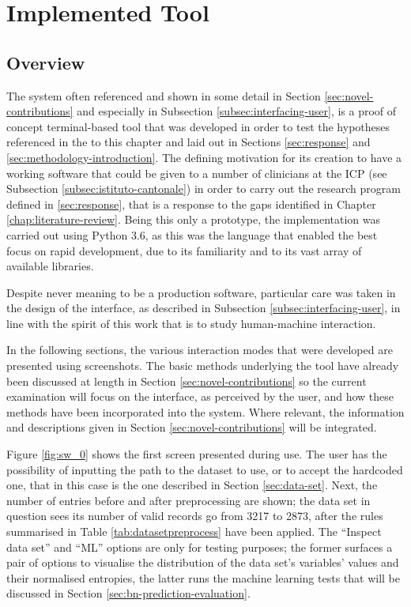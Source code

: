 \section{Implemented Tool} \label{sec:implemented-tool}
\subsection{Overview}
The system often referenced and shown in some detail in Section \ref{sec:novel-contributions} and especially in Subsection \ref{subsec:interfacing-user}, is a proof of concept terminal-based tool that was developed in order to test the hypotheses referenced in the  to this chapter and laid out in Sections \ref{sec:response} and \ref{sec:methodology-introduction}.
The defining motivation for its creation to have a working software that could be given to a number of clinicians at the ICP (see Subsection \ref{subsec:istituto-cantonale}) in order to carry out the research program defined in \ref{sec:response}, that is a response to the gaps identified in Chapter \ref{chap:literature-review}.
Being this only a prototype, the implementation was carried out using Python 3.6, as this was the language that enabled the best focus on rapid development, due to its familiarity and to its vast array of available libraries.

Despite never meaning to be a production software, particular care was taken in the design of the interface, as described in Subsection \ref{subsec:interfacing-user}, in line with the spirit of this work that is to study human-machine interaction.

In the following sections, the various interaction modes that were developed are presented using screenshots.
The basic methods underlying the tool have already been discussed at length in Section \ref{sec:novel-contributions} so the current examination will focus on the interface, as perceived by the user, and how these methods have been incorporated into the system.
Where relevant, the information and descriptions given in Section \ref{sec:novel-contributions} will be integrated.

Figure \ref{fig:sw_0} shows the first screen presented during use.
The user has the possibility of inputting the path to the dataset to use, or to accept the hardcoded one, that in this case is the one described in Section \ref{sec:data-set}.
Next, the number of entries before and after preprocessing are shown; the data set in question sees its number of valid records go from 3217 to 2873, after the rules summarised in Table \ref{tab:datasetpreprocess} have been applied.
The \enquote{Inspect data set} and \enquote{ML} options are only for testing purposes; the former surfaces a pair of options to visualise the distribution of the data set's variables' values and their normalised entropies, the latter runs the machine learning tests that will be discussed in Section \ref{sec:bn-prediction-evaluation}.


